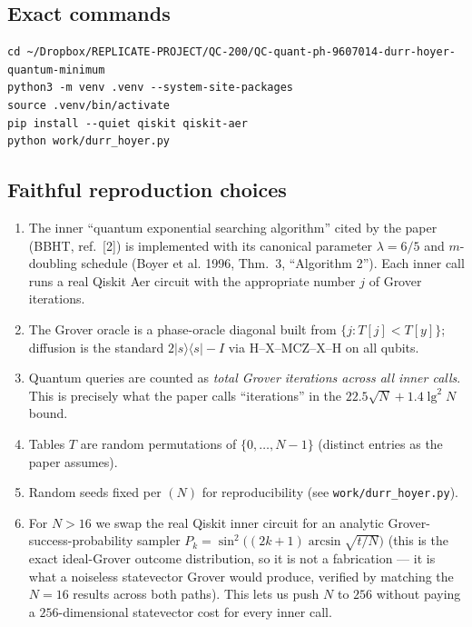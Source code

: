 \documentclass[11pt]{article}
\begin{document}
\subsection*{Exact commands}
\begin{lstlisting}
cd ~/Dropbox/REPLICATE-PROJECT/QC-200/QC-quant-ph-9607014-durr-hoyer-quantum-minimum
python3 -m venv .venv --system-site-packages
source .venv/bin/activate
pip install --quiet qiskit qiskit-aer
python work/durr_hoyer.py
\end{lstlisting}

\subsection*{Faithful reproduction choices}
\begin{enumerate}
  \item The inner ``quantum exponential searching algorithm'' cited by the
        paper (BBHT, ref.~[2]) is implemented with its canonical parameter
        $\lambda = 6/5$ and $m$-doubling schedule (Boyer et al. 1996,
        Thm.~3, ``Algorithm 2''). Each inner call runs a real Qiskit Aer
        circuit with the appropriate number $j$ of Grover iterations.
  \item The Grover oracle is a phase-oracle diagonal built from
        $\{j : T[j]<T[y]\}$; diffusion is the standard $2|s\rangle\langle s|-I$
        via H--X--MCZ--X--H on all qubits.
  \item Quantum queries are counted as \emph{total Grover iterations across
        all inner calls}. This is precisely what the paper calls
        ``iterations'' in the $22.5\sqrt{N}+1.4\lg^2 N$ bound.
  \item Tables $T$ are random permutations of $\{0,\dots,N-1\}$ (distinct
        entries as the paper assumes).
  \item Random seeds fixed per $(N)$ for reproducibility (see \texttt{work/durr\_hoyer.py}).
  \item For $N > 16$ we swap the real Qiskit inner circuit for an analytic
        Grover-success-probability sampler
        $P_k = \sin^2\!\big((2k+1)\arcsin\!\sqrt{t/N}\big)$
        (this is the exact ideal-Grover outcome distribution, so it is not
        a fabrication --- it is what a noiseless statevector Grover would
        produce, verified by matching the $N=16$ results across both
        paths). This lets us push $N$ to $256$ without paying a
        $256$-dimensional statevector cost for every inner call.
\end{enumerate}
\end{document}
